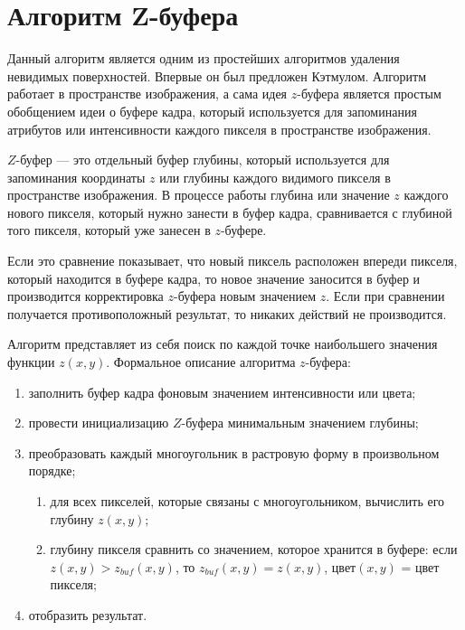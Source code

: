 \FloatBarrier

\section{Алгоритм Z-буфера}

Данный алгоритм является одним из простейших алгоритмов удаления невидимых поверхностей. Впервые он был предложен Кэтмулом. Алгоритм работает в пространстве изображения, а сама идея $z$-буфера является простым обобщением идеи о буфере кадра, который используется для запоминания атрибутов или интенсивности каждого пикселя в пространстве изображения.

$Z$-буфер --- это отдельный буфер глубины, который используется для запоминания координаты $z$ или глубины каждого видимого пикселя в пространстве изображения. В процессе работы глубина или значение $z$ каждого нового пикселя, который нужно занести в буфер кадра, сравнивается с глубиной того пикселя, который уже занесен в $z$-буфере.

Если это сравнение показывает, что новый пиксель расположен впереди пикселя, который находится в буфере кадра, то новое значение заносится в буфер и производится корректировка $z$-буфера новым значением $z$. Если при сравнении получается противоположный результат, то никаких действий не производится.

Алгоритм представляет из себя поиск по каждой точке наибольшего значения функции $z(x, y)$. Формальное описание алгоритма $z$-буфера:

\begin{enumerate}[label=\arabic*)]
	\item заполнить буфер кадра фоновым значением интенсивности или цвета;
	\item провести инициализацию $Z$-буфера минимальным значением глубины;
	\item преобразовать каждый многоугольник в растровую форму в произвольном порядке;
	\begin{enumerate}
		\item для всех пикселей, которые связаны с многоугольником, вычислить его глубину $z(x, y)$;
		\item глубину пикселя сравнить со значением, которое хранится в буфере: если $z(x, y) > z_{buf}(x, y)$, то $z_{buf}(x, y) = z(x, y)$, цвет$(x, y)$ = цвет пикселя;
	\end{enumerate}
	\item отобразить результат.
\end{enumerate}

